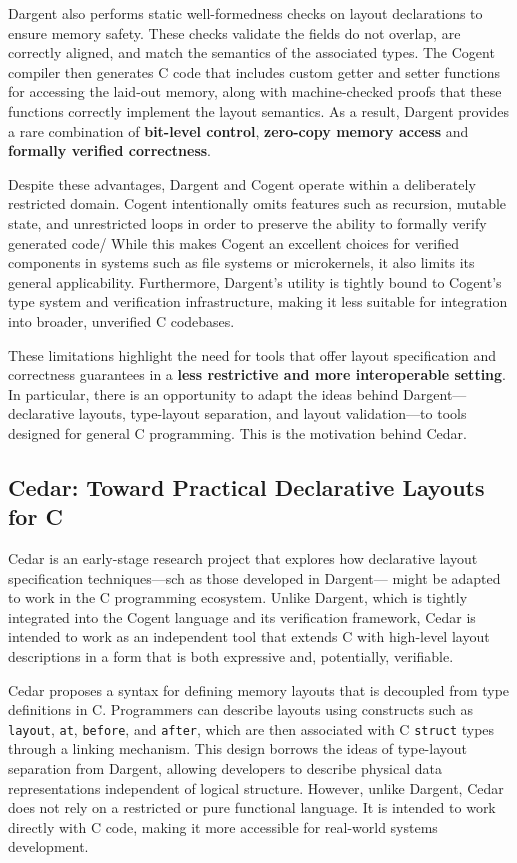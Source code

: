 \documentclass[12pt]{article}
\begin{document}
Dargent also performs static well-formedness checks on layout declarations
to ensure memory safety. These checks validate the fields do not overlap,
are correctly aligned, and match the semantics of the associated types. 
The Cogent compiler then generates C code that includes custom getter and
setter functions for accessing the laid-out memory, along with machine-checked
proofs that these functions correctly implement the layout semantics.
As a result, Dargent provides a rare combination of
\textbf{bit-level control}, \textbf{zero-copy memory access}
and \textbf{formally verified correctness}.

Despite these advantages, Dargent and Cogent operate within a deliberately
restricted domain. Cogent intentionally omits features such as recursion,
mutable state, and unrestricted loops in order to preserve the ability to
formally verify generated code/ While this makes Cogent an excellent choices
for verified components in systems such as file systems or microkernels, it
also limits its general applicability. Furthermore, Dargent's utility is tightly
bound to Cogent's type system and verification infrastructure, making
it less suitable for integration into broader, unverified C codebases.

These limitations highlight the need for tools that offer layout specification
and correctness guarantees in a
\textbf{less restrictive and more interoperable setting}. In particular, there
is an opportunity to adapt the ideas behind Dargent---declarative layouts, 
type-layout separation, and layout validation---to tools designed for general
C programming. This is the motivation behind Cedar.

\subsection{Cedar: Toward Practical Declarative Layouts for C}
Cedar is an early-stage research project that explores how declarative
layout specification techniques---sch as those developed in Dargent--- might be
adapted to work in the C programming ecosystem. Unlike Dargent, which is
tightly integrated into the Cogent language and its verification framework, Cedar 
is intended to work as an independent tool that extends C with high-level layout 
descriptions in a form that is both expressive and, potentially, verifiable.

Cedar proposes a syntax for defining memory layouts that is decoupled
from type definitions in C. Programmers can describe layouts using 
constructs such as \texttt{layout}, \texttt{at}, \texttt{before},
and \texttt{after}, which are then associated with C \texttt{struct}
types through a linking mechanism. This design borrows the ideas
of type-layout separation from Dargent, allowing developers to
describe physical data representations independent of logical structure.
However, unlike Dargent, Cedar does not rely on a restricted or pure functional
language. It is intended to work directly with C code, making it more accessible
for real-world systems development.
\end{document}
